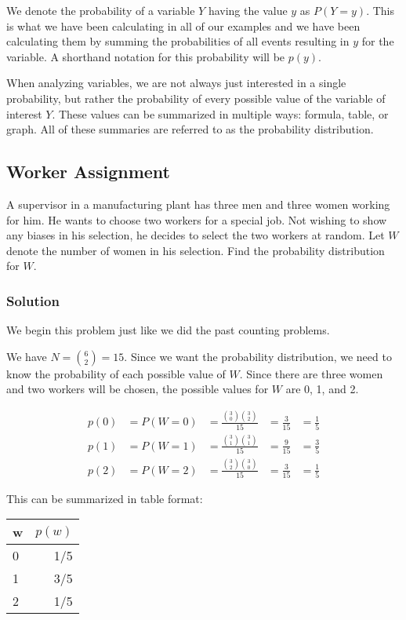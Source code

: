 \documentclass[11pt]{article}
\theoremstyle{definition}
\begin{document}
We denote the probability of a variable $Y$ having the value $y$ as $P(Y=y)$. This is what we have been calculating in all of our examples and we have been calculating them by summing the probabilities of all events resulting in $y$ for the variable. A shorthand notation for this probability will be $p(y)$.

When analyzing variables, we are not always just interested in a single probability, but rather the probability of every possible value of the variable of interest $Y$. These values can be summarized in multiple ways: formula, table, or graph. All of these summaries are referred to as the probability distribution.

\subsection{Worker Assignment}

A supervisor in a manufacturing plant has three men and three women working for him. He wants to choose two workers for a special job. Not wishing to show any biases in his selection, he decides to select the two workers at random. Let $W$ denote the number of women in his selection. Find the probability distribution for $W$.

\subsubsection*{Solution}


We begin this problem just like we did the past counting problems.

We have $N = {6 \choose 2} = 15$. Since we want the probability distribution, we need to know the probability of each possible value of $W$. Since there are three women and two workers will be chosen, the possible values for $W$ are 0, 1, and 2.

$$
	\begin{aligned}
		p(0) & = P(W = 0) & = \frac{{3 \choose 0}{3 \choose 2}}{15} & = \frac{3}{15} & = \frac{1}{5} \\
		p(1) & = P(W = 1) & = \frac{{3 \choose 1}{3 \choose 1}}{15} & = \frac{9}{15} & = \frac{3}{5} \\
		p(2) & = P(W = 2) & = \frac{{3 \choose 2}{3 \choose 0}}{15} & = \frac{3}{15} & = \frac{1}{5}
	\end{aligned}
$$

This can be summarized in table format:

\begin{table}[h]
	\centering
	\begin{tabular}{lr}
		\hline
		w & $p(w)$ \\
		\hline
		0 & 1/5 \\
		1 & 3/5 \\
		2 & 1/5 \\
		\hline
	\end{tabular}
\end{table}
\end{document}
